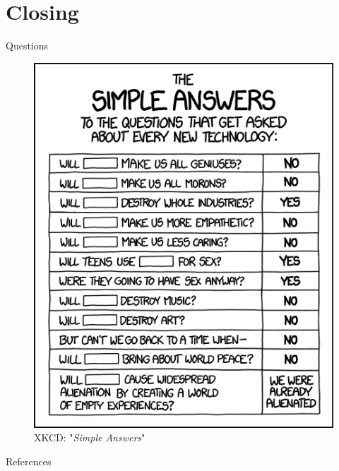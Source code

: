 \documentclass{beamer}
\begin{document}
\section{Closing}

\begin{frame}{Questions}
	\begin{figure}
		\includegraphics[width=.4\textwidth]{../Images/xkcd_simple_answers.png}
		\caption{XKCD: "\textit{Simple Answers}" \cite{xkcd-simple-answers}}
	\end{figure}
\end{frame}

\begin{frame}[allowframebreaks]{References}
\printbibliography
\end{frame}
\end{document}
